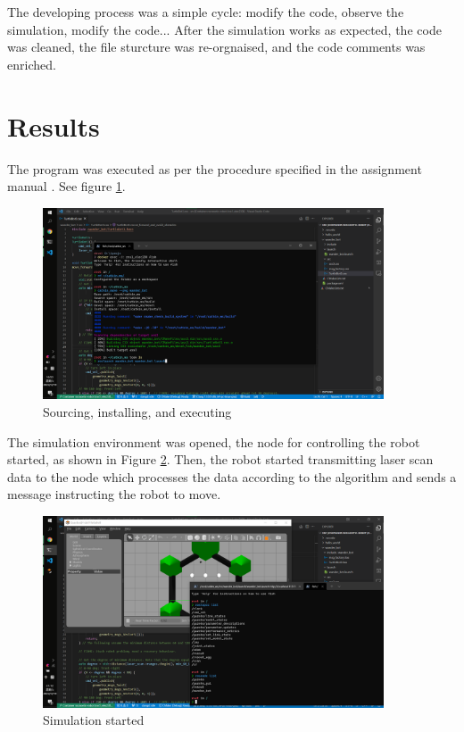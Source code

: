 The developing process was a simple cycle: modify the code, observe the simulation, modify the code... After the simulation works as expected, the code was cleaned, the file sturcture was re-orgnaised, and the code comments was enriched.

\section{Results}

The program was executed as per the procedure specified in the assignment manual \cite{ref:ass3_manual}. See figure \ref{fig:source_install_and_execute}.

\begin{figure}[htbp]
   \centering
   \includegraphics[width=0.9\textwidth]{figures/source_install_and_execute.png}
   \caption{Sourcing, installing, and executing}
   \label{fig:source_install_and_execute}
\end{figure}

The simulation environment was opened, the node for controlling the robot started, as shown in Figure \ref{fig:sim_started}. Then, the robot started transmitting laser scan data to the node which processes the data according to the algorithm and sends a message instructing the robot to move.

\begin{figure}[htbp]
   \centering
   \includegraphics[width=0.9\textwidth]{figures/sim_started.png}
   \caption{Simulation started}
   \label{fig:sim_started}
\end{figure}

